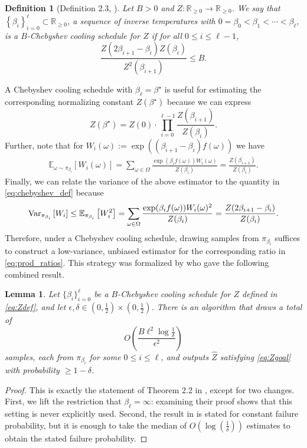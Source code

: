 \documentclass[11pt]{article}
\newtheorem{lemma}{Lemma}
\newtheorem{definition}{Definition}
\newcommand{\defeq}{:=}
\newcommand{\eps}{\epsilon}
\newcommand{\R}{\mathbb{R}}
\newcommand{\half}{\frac{1}{2}}
\newcommand{\1}{\mathbf{1}}
\newcommand{\0}{\mathbf{0}}
\newcommand{\E}{\mathbb{E}}
\newcommand{\Var}{\textup{Var}}
\newcommand{\Par}[1]{\left(#1\right)}
\newcommand{\Brack}[1]{\left[#1\right]}
\newcommand{\cbra}[1]{\left\{#1\right\}}
\newcommand{\hZ}{\widehat{Z}}
\begin{document}
\begin{definition}[Definition 2.3, \cite{StefankovicVV09}]
    \label{def:Chebyshev_schedule}
    Let $B > 0$ and $Z: \R_{\ge 0} \to \R_{\ge 0}$. We say that $\cbra{\beta_i}_{i=0}^\ell \subset \R_{\ge 0}$, a sequence of inverse temperatures with $0 = \beta_0 < \beta_1 < \cdots < \beta_\ell$, is a \emph{$B$-Chebyshev cooling schedule for $Z$} if for all $0 \le i \le \ell - 1$, 
    \begin{equation}\label{eq:chebyshev_def}
        \frac{Z(2\beta_{i+1}-\beta_i)Z(\beta_i)}{Z^2(\beta_{i+1})}\le B.
    \end{equation}
\end{definition}

A Chebyshev cooling schedule with $\beta_\ell = \beta^\star$ is useful for estimating the corresponding normalizing constant $Z(\beta^\star)$ because we can express
\begin{equation}\label{eq:prod_ratios}Z(\beta^\star) = Z(0) \cdot \prod_{i = 0}^{\ell - 1} \frac{Z(\beta_{i + 1})}{Z(\beta_i)}. \end{equation}
Further, note that for $W_i(\omega) \defeq \exp\Par{(\beta_{i + 1} - \beta_{i})f(\omega)}$ we have
\begin{align*}\E_{\omega \sim \pi_{\beta_i}}\Brack{W_i(\omega)} = \sum_{\omega \in \Omega} \frac{\exp\Par{\beta_i f(\omega)}W_i(\omega)}{Z(\beta_i)}  = \frac{Z(\beta_{i + 1})}{Z(\beta_i)}.  \end{align*}
Finally, we can relate the variance of the above estimator to the quantity in \eqref{eq:chebyshev_def} because
\[\Var_{\pi_{\beta_i}}\Brack{W_i} \le \E_{\pi_{\beta_i}}\Brack{W_i^2} = \sum_{\omega \in \Omega} \frac{\exp(\beta_i f(\omega)) W_i(\omega)^2}{Z(\beta_i)} = \frac{Z(2\beta_{i + 1} - \beta_i)}{Z(\beta_i)}. \]
Therefore, under a Chebyshev cooling schedule, drawing samples from $\pi_{\beta_i}$ suffices to construct a low-variance, unbiased estimator for the corresponding ratio in \eqref{eq:prod_ratios}. This strategy was formalized by \cite{dyer1991computing, StefankovicVV09} who gave the following combined result.

\begin{lemma}\label{lem:chebyshev_to_Z}
Let $\{\beta_i\}_{i = 0}^\ell$ be a $B$-Chebyshev cooling schedule for $Z$ defined in \eqref{eq:Zdef}, and let $\eps, \delta \in (0, \half) \times (0, \half)$. There is an algorithm that draws a total of
\[O\Par{\frac{B\ell^2\log \frac 1 \delta}{\eps^2}}\]
samples, each from $\pi_{\beta_i}$ for some $0 \le i \le \ell$, and outputs $\hZ$ satisfying \eqref{eq:Zgoal} with probability $\ge 1 - \delta$.
\end{lemma}
\begin{proof}
This is exactly the statement of Theorem 2.2 in \cite{StefankovicVV09}, except for two changes. First, we lift the restriction that $\beta_\ell = \infty$: examining their proof shows that this setting is never explicitly used. Second, the result in \cite{StefankovicVV09} is stated for constant failure probability, but it is enough to take the median of $O(\log(\frac 1 \delta))$ estimates to obtain the stated failure probability.
\end{proof}
\end{document}
